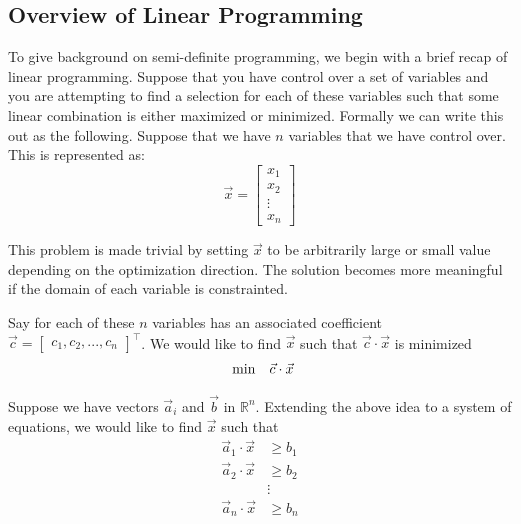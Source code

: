 \documentclass{article}
\begin{document}
\subsection{Overview of Linear Programming}
To give background on semi-definite programming, we begin with a brief recap of linear programming.
Suppose that you have control over a set of variables and you are attempting to find a selection for each of these variables such that some linear combination is either maximized or minimized.
Formally we can write this out as the following. Suppose that we have \( n \) variables that we have control over. This is represented as:
\[
\vec{x} = \begin{bmatrix} x_1 \\ x_2 \\ \vdots \\ x_n \end{bmatrix}
\]

This problem is made trivial by setting \( \vec{x} \) to be arbitrarily large or small value depending on the optimization direction.
The solution becomes more meaningful if the domain of each variable is constrainted.

Say for each of these \( n \) variables has an associated coefficient \( \vec{c} = \begin{bmatrix} c_1, c_2, ..., c_n  \end{bmatrix}^\top \).
We would like to find \( \vec{x} \) such that \( \vec{c} \cdot \vec{x} \) is minimized
\begin{align*}
  \begin{array}{ll@{}ll}
  \min  & \vec{c} \cdot \vec{x}
  \end{array}
\end{align*}

Suppose we have vectors \( \vec{a}_i \) and \( \vec{b} \) in $\mathbb{R}^n$.
Extending the above idea to a system of equations, we would like to find \( \vec{x} \) such that
\begin{align*}
\vec{a}_1 \cdot \vec{x} &\geq b_1 \\
\vec{a}_2 \cdot \vec{x} &\geq b_2 \\
& \vdots  \\
\vec{a}_n \cdot \vec{x} &\geq b_n \\
\end{align*}

\newpage
\end{document}
